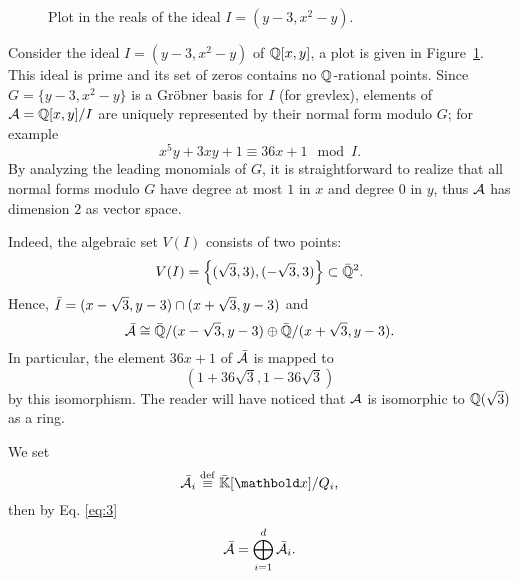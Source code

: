 \begin{example}
  \begin{figure}[ht]
    \centering
    \caption{Plot in the reals of the ideal $I=(y-3,x^2-y)$.}
    \label{fig:ideal-parabola-line}
  \end{figure}

    Consider the ideal
  $I=(y-3,x^2-y)$ of $\mathbb{Q}[x,y]$, a plot is given in
  Figure~\ref{fig:ideal-parabola-line}. This ideal is prime and its
  set of zeros contains no $\mathbb{Q}$-rational points. Since
  $G=\{y-3,x^2-y\}$ is a Gröbner basis for $I$ (for grevlex), elements
  of $\mathcal{A}=\mathbb{Q}[x,y]/I$ are uniquely represented by their normal
  form modulo $G$; for example
  \[x^5y + 3xy + 1 \equiv 36x + 1 \mod I\text{.}\] By analyzing the
  leading monomials of $G$, it is straightforward to realize that all
  normal forms modulo $G$ have degree at most $1$ in $x$ and degree
  $0$ in $y$, thus $\mathcal{A}$ has dimension $2$ as vector space.

  Indeed, the algebraic set $V(I)$ consists of two points:
  \[V(I)=\left\{(\sqrt{3},3), (-\sqrt{3},3)\right\}\subset\bar{\mathbb{Q}}^2\text{.}\]
  Hence, $\bar{I}=(x-\sqrt{3},y-3)\cap(x+\sqrt{3},y-3)$ and
  \[\bar{\mathcal{A}}\cong \bar{\mathbb{Q}}/(x-\sqrt{3},y-3) \oplus
  \bar{\mathbb{Q}}/(x+\sqrt{3},y-3)\text{.}\] In particular, the element
  $36x+1$ of $\bar{\mathcal{A}}$ is mapped to
  \[(1+36\sqrt{3},1-36\sqrt{3})\] by this isomorphism. The reader will
  have noticed that $\mathcal{A}$ is isomorphic to $\mathbb{Q}(\sqrt{3})$ as a ring.
\end{example}

We set 
\begin{equation}
  \label{eq:4}
  \clot{\algeb{A}}_i\eqdef \clot{\K}[\lst{x}]/Q_i
  \text{,}
\end{equation}
then by Eq. \eqref{eq:3} 
\begin{equation}
  \label{eq:5}
  \bar{\mathcal{A}} = \bigoplus_{i=1}^d\bar{\mathcal{A}_i}
  \text{.}
\end{equation}

